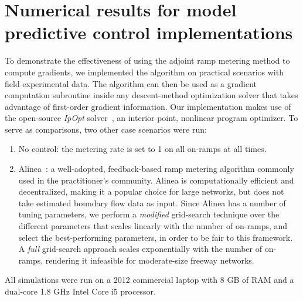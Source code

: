 \section{Numerical results for model predictive control implementations\label{sec:Numerical-results-for}}

To demonstrate the effectiveness of using the adjoint ramp metering
method to compute gradients, we implemented the algorithm on practical scenarios with field experimental data.
The algorithm can then be used as a gradient computation subroutine
inside any descent-method optimization solver that takes advantage
of first-order gradient information. Our implementation makes use
of the open-source \emph{IpOpt} solver~\cite{Andreas2005}, an interior point, nonlinear program optimizer. To serve
as comparisons, two other case scenarios were run:
\begin{enumerate}
\item No control: the metering rate is set to 1 on all on-ramps at all times.
\item Alinea~\cite{Papageorgiou1991}: a well-adopted, feedback-based ramp metering
algorithm commonly used in the practitioner's community. Alinea is computationally efficient and decentralized,
making it a popular choice for large networks, but does not take estimated
boundary flow data as input. Since Alinea has a number of tuning parameters,
we perform a \emph{modified} grid-search technique over the different
parameters that scales linearly with the number of on-ramps, and select
the best-performing parameters, in order to be fair to this framework. A \emph{full} grid-search approach
scales exponentially with the number of on-ramps, rendering it infeasible
for moderate-size freeway networks.
\end{enumerate}
All simulations were run on a 2012 commercial laptop with 8 GB of RAM and a dual-core 1.8 GHz Intel Core i5 processor.

